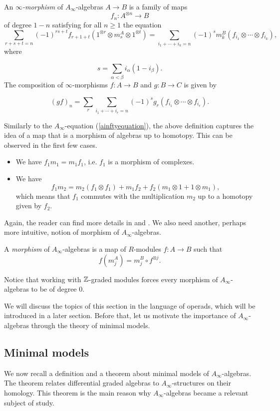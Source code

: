 \documentclass[Thesis.tex]{subfiles}
\begin{document}
\begin{defin}\label{inftymorphism}
An \emph{$\infty$-morphism} of $A_\infty$-algebras $A\to B$ is a family of maps \[f_n:A^{\otimes n}\to B\] of degree $1-n$ satisfying for all $n\geq 1$ the equation
\[\sum_{r+s+t=n} (-1)^{rs+t}f_{r+1+t}(1^{\otimes r} \otimes m^A_s\otimes 1^{\otimes t})=\sum_{i_1+\cdots+i_k=n} (-1)^s m^B_k(f_{i_1}\otimes\cdots\otimes f_{i_k}),\]
where

\[s=\sum_{\alpha<\beta}i_\alpha(1-i_\beta).\]
The composition of $\infty$-morphisms $f:A\to B$ and  $g:B\to C$ is given by 

\[(gf)_n=\sum_r\sum_{i_1+\cdots+i_r=n}(-1)^s g_r(f_{i_1}\otimes\cdots
\otimes f_{i_r}).\]
\end{defin}

Similarly to the $A_\infty$-equation (\ref{ainftyequation}), the above definition captures the idea of a map that is a morphism of algebras up to homotopy. This can be observed in the first few cases.

\begin{itemize}
\item We have $f_1m_1 = m_1f_1$, i.e. $f_1$ is a morphism of complexes.
\item We have
\[
f_1m_2 = m_2 (f_1\otimes f_1) + m_1f_2 + f_2 (m_1\otimes 1 + 1\otimes m_1),\]
which means that $f_1$ commutes with the multiplication $m_2$ up to a homotopy
given by $f_2$.
\end{itemize}

Again, the reader can find more details in \cite{keller} and \cite[\S 9.2]{lodayvallette}. We also need another, perhaps more intuitive, notion of morphism of $A_\infty$-algebras.
 
\begin{defin}\label{inftyalgebramorphism}
A \emph{morphism} of $A_\infty$-algebras is a map of $R$-modules $f:A\to B$ such that
\[f(m^A_j)=m^B_j\circ f^{\otimes j}.\]
\end{defin}

Notice that working with $\mathbb{Z}$-graded modules forces every morphism of $A_\infty$-algebras to be of degree 0.

We will discuss the topics of this section in the language of operads, which will be introduced in a later section. Before that, let us motivate the importance of $A_\infty$-algebras through the theory of minimal models.
\pagebreak
\subsection{Minimal models}\label{minimalmodels}
We now recall a definition and a theorem about minimal models of $A_\infty$-algebras. The theorem relates differential graded algebras to $A_\infty$-structures on their homology. This theorem is the main reason why $A_\infty$-algebras became a relevant subject of study.
\end{document}
